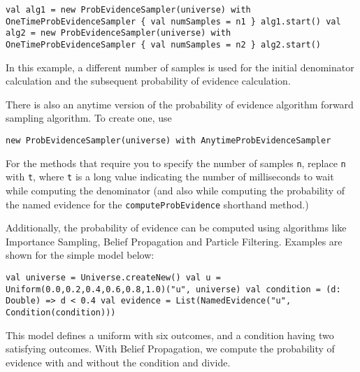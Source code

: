 \begin{flushleft}
\texttt{val alg1 = new ProbEvidenceSampler(universe) with
\newline \tab OneTimeProbEvidenceSampler \{ val numSamples = n1 \}
\newline alg1.start()
\newline val alg2 = new ProbEvidenceSampler(universe) with
\newline \tab OneTimeProbEvidenceSampler \{ val numSamples = n2 \}
\newline alg2.start()
}
\end{flushleft}

In this example, a different number of samples is used for the initial denominator calculation and the subsequent probability of evidence calculation.

There is also an anytime version of the probability of evidence algorithm forward sampling algorithm. To create one, use

\begin{flushleft}
\texttt{new ProbEvidenceSampler(universe) with AnytimeProbEvidenceSampler}
\end{flushleft}

For the methods that require you to specify the number of samples \texttt{n}, replace \texttt{n} with \texttt{t}, where \texttt{t} is a long value indicating the number of milliseconds to wait while computing the denominator (and also while computing the probability of the named evidence for the \texttt{computeProbEvidence} shorthand method.)

Additionally, the probability of evidence can be computed using algorithms like Importance Sampling, Belief Propagation and Particle Filtering. Examples are shown for the simple model below: 

\begin{flushleft}
    \texttt{val universe = Universe.createNew()
    \newline val u = Uniform(0.0,0.2,0.4,0.6,0.8,1.0)("u", universe)
    \newline val condition = (d: Double) => d < 0.4
    \newline val evidence = List(NamedEvidence("u", Condition(condition)))
}
\end{flushleft}

This model defines a uniform with six outcomes, and a condition having two satisfying outcomes.
With Belief Propagation, we compute the probability of evidence with and without the condition and divide.

